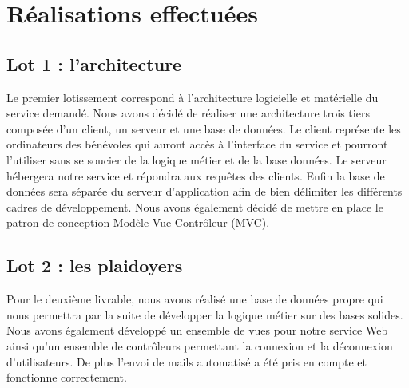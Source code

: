 \documentclass[asi]{picInsa}
\begin{document}
\section{Réalisations effectuées}
\subsection{Lot 1 : l'architecture}
Le premier lotissement correspond à l'architecture logicielle et matérielle du service demandé. Nous avons décidé de réaliser une architecture trois tiers composée d'un client, un serveur et une base de données. Le client représente les ordinateurs des bénévoles qui auront accès à l'interface du service et pourront l'utiliser sans se soucier de la logique métier et de la base données. Le serveur hébergera notre service et répondra aux requêtes des clients. Enfin la base de données sera séparée du serveur d'application afin de bien délimiter les différents cadres de développement. Nous avons également décidé de mettre en place le patron de conception Modèle-Vue-Contrôleur (MVC).\\

\subsection{Lot 2 : les plaidoyers}
Pour le deuxième livrable, nous avons réalisé une base de données propre qui nous permettra par la suite de développer la logique métier sur des bases solides. Nous avons également développé un ensemble de vues pour notre service Web ainsi qu'un ensemble de contrôleurs permettant la connexion et la déconnexion  d'utilisateurs. De plus l'envoi de mails automatisé a été pris en compte et fonctionne correctement.


 
	 
\pageQuatriemeCouverture
\end{document}
